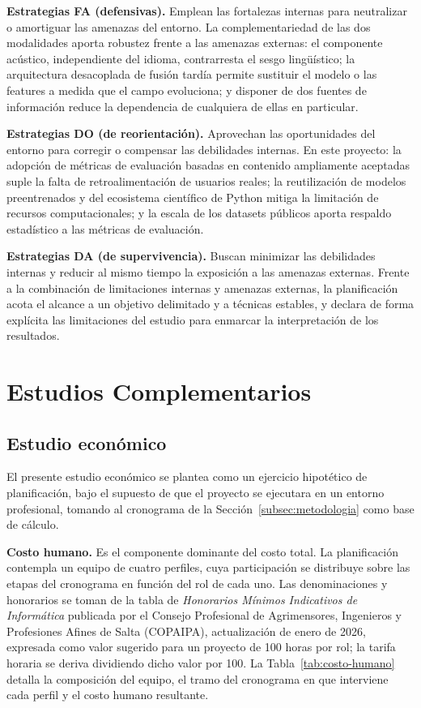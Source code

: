 \textbf{Estrategias FA (defensivas).} Emplean las fortalezas internas para neutralizar o amortiguar las amenazas del entorno. La complementariedad de las dos modalidades aporta robustez frente a las amenazas externas: el componente acústico, independiente del idioma, contrarresta el sesgo lingüístico; la arquitectura desacoplada de fusión tardía permite sustituir el modelo o las features a medida que el campo evoluciona; y disponer de dos fuentes de información reduce la dependencia de cualquiera de ellas en particular.

\textbf{Estrategias DO (de reorientación).} Aprovechan las oportunidades del entorno para corregir o compensar las debilidades internas. En este proyecto: la adopción de métricas de evaluación basadas en contenido ampliamente aceptadas suple la falta de retroalimentación de usuarios reales; la reutilización de modelos preentrenados y del ecosistema científico de Python mitiga la limitación de recursos computacionales; y la escala de los datasets públicos aporta respaldo estadístico a las métricas de evaluación.

\textbf{Estrategias DA (de supervivencia).} Buscan minimizar las debilidades internas y reducir al mismo tiempo la exposición a las amenazas externas. Frente a la combinación de limitaciones internas y amenazas externas, la planificación acota el alcance a un objetivo delimitado y a técnicas estables, y declara de forma explícita las limitaciones del estudio para enmarcar la interpretación de los resultados.

\section{Estudios Complementarios}
\label{sec:estudios}

\subsection{Estudio económico}
\label{subsec:estudio-economico}

El presente estudio económico se plantea como un ejercicio hipotético de planificación, bajo el supuesto de que el proyecto se ejecutara en un entorno profesional, tomando al cronograma de la Sección~\ref{subsec:metodologia} como base de cálculo.

\textbf{Costo humano.} Es el componente dominante del costo total. La planificación contempla un equipo de cuatro perfiles, cuya participación se distribuye sobre las etapas del cronograma en función del rol de cada uno. Las denominaciones y honorarios se toman de la tabla de \textit{Honorarios Mínimos Indicativos de Informática} publicada por el Consejo Profesional de Agrimensores, Ingenieros y Profesiones Afines de Salta (COPAIPA), actualización de enero de 2026, expresada como valor sugerido para un proyecto de 100 horas por rol; la tarifa horaria se deriva dividiendo dicho valor por 100. La Tabla~\ref{tab:costo-humano} detalla la composición del equipo, el tramo del cronograma en que interviene cada perfil y el costo humano resultante.

